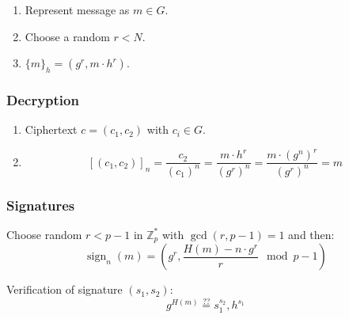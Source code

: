 \documentclass{article}
\newcommand{\Z}{\mathbb{Z}}
\begin{document}
\begin{enumerate}
  \item Represent message as $m \in G$.
  \item Choose a random $r < N$.
  \item $\{m\}_h = (g^r, m \cdot h^r)$.
\end{enumerate}

\subsubsection{Decryption}
\begin{enumerate}
  \item Ciphertext $c = (c_1,c_2)$ with $c_i \in G$.
  \item \[
      [(c_1, c_2)]_n = \frac{c_2}{(c_1)^n} = \frac{m \cdot h^r}{(g^r)^n} = \frac{m \cdot (g^n)^r}{(g^r)^n} = m
    \]
\end{enumerate}


\subsubsection{Signatures}

Choose random $r < p-1$ in $\Z^*_p$ with $\gcd(r,p-1) = 1$ and then:
\[
  \operatorname{sign}_n(m) = \left( g^r, \frac{H(m) - n \cdot g^r}{r} \mod p-1 \right)
\]

Verification of signature $(s_1, s_2)$:
\[
  g^{H(m)} \overset{??}{=} s_1^{s_2}, h^{s_1}
\]
\end{document}
